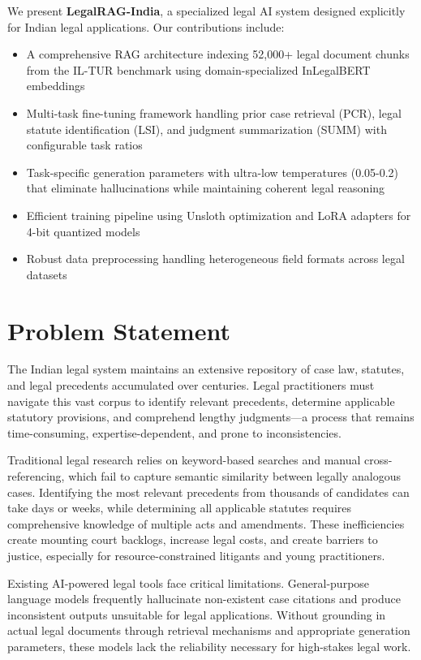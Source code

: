 \documentclass[11pt]{article}
\begin{document}
We present \textbf{LegalRAG-India}, a specialized legal AI system designed explicitly for Indian legal applications. Our contributions include:

\begin{itemize}
\item A comprehensive RAG architecture indexing 52,000+ legal document chunks from the IL-TUR benchmark using domain-specialized InLegalBERT embeddings
\item Multi-task fine-tuning framework handling prior case retrieval (PCR), legal statute identification (LSI), and judgment summarization (SUMM) with configurable task ratios
\item Task-specific generation parameters with ultra-low temperatures (0.05-0.2) that eliminate hallucinations while maintaining coherent legal reasoning
\item Efficient training pipeline using Unsloth optimization and LoRA adapters for 4-bit quantized models
\item Robust data preprocessing handling heterogeneous field formats across legal datasets
\end{itemize}

\section{Problem Statement}

The Indian legal system maintains an extensive repository of case law, statutes, and legal precedents accumulated over centuries. Legal practitioners must navigate this vast corpus to identify relevant precedents, determine applicable statutory provisions, and comprehend lengthy judgments—a process that remains time-consuming, expertise-dependent, and prone to inconsistencies.

Traditional legal research relies on keyword-based searches and manual cross-referencing, which fail to capture semantic similarity between legally analogous cases. Identifying the most relevant precedents from thousands of candidates can take days or weeks, while determining all applicable statutes requires comprehensive knowledge of multiple acts and amendments. These inefficiencies create mounting court backlogs, increase legal costs, and create barriers to justice, especially for resource-constrained litigants and young practitioners.

Existing AI-powered legal tools face critical limitations. General-purpose language models frequently hallucinate non-existent case citations and produce inconsistent outputs unsuitable for legal applications. Without grounding in actual legal documents through retrieval mechanisms and appropriate generation parameters, these models lack the reliability necessary for high-stakes legal work.
\end{document}
